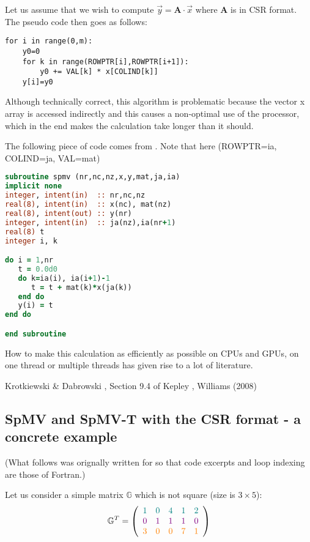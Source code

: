 Let us assume that we wish to compute $\vec{y}={\bm A}\cdot \vec{x}$ where ${\bm A}$ 
is in CSR format. The pseudo code then goes as follows:
\begin{verbatim}
for i in range(0,m):
    y0=0
    for k in range(ROWPTR[i],ROWPTR[i+1]):
        y0 += VAL[k] * x[COLIND[k]]
    y[i]=y0
\end{verbatim} 
Although technically correct, this algorithm is problematic because the vector x array
is accessed indirectly and this causes a non-optimal use of the processor, which 
in the end makes the calculation take longer than it should.


The following piece of code comes from \elefant. Note that here (ROWPTR=ia, COLIND=ja, VAL=mat)
\begin{lstlisting}[language=Fortran]
subroutine spmv (nr,nc,nz,x,y,mat,ja,ia)
implicit none
integer, intent(in)  :: nr,nc,nz
real(8), intent(in)  :: x(nc), mat(nz)
real(8), intent(out) :: y(nr)
integer, intent(in)  :: ja(nz),ia(nr+1)
real(8) t
integer i, k

do i = 1,nr
   t = 0.0d0
   do k=ia(i), ia(i+1)-1
      t = t + mat(k)*x(ja(k))
   end do
   y(i) = t 
end do

end subroutine
\end{lstlisting}


How to make this calculation as efficiently as possible on CPUs and GPUs, on one thread 
or multiple threads has given rise to a lot of literature.

\Literature Krotkiewski \& Dabrowski \cite{krda10}, Section 9.4 of Kepley \cite{knepley}, 
Williams \etal (2008) \cite{widc08}

\subsection{SpMV and SpMV-T with the CSR format - a concrete example}

(What follows was orignally written for \elefant so that code excerpts and loop indexing 
are those of Fortran.)

Let us consider a simple matrix $\mathbb{G}$ which is not square (size is $3\times5$):
\[
{\mathbb{G}}^T=
\left(
\begin{array}{ccccc}
{\color{teal} 1} & {\color{teal}0}& {\color{teal}4}& {\color{teal}1}& {\color{teal}2}\\
{\color{violet}0}& {\color{violet}1}& {\color{violet}1}& {\color{violet}1}& {\color{violet}0}\\
{\color{orange}3}& {\color{orange}0} & {\color{orange}0}& {\color{orange}7}& {\color{orange}1}
\end{array}
\right)
\]

